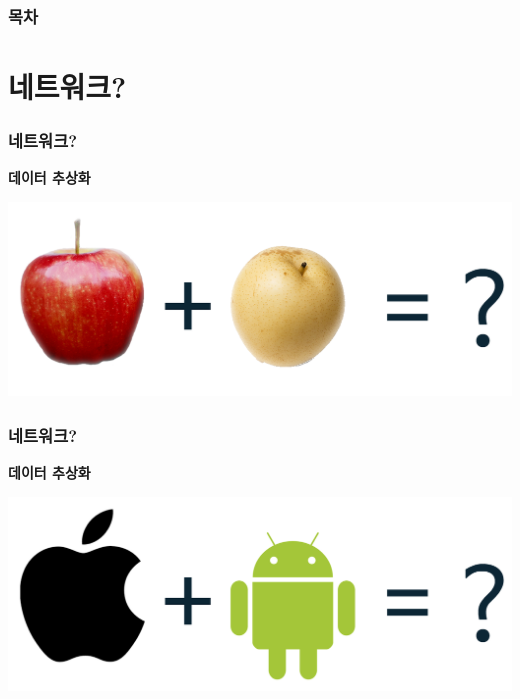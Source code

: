 \documentclass{beamer}
\begin{document}
\begin{frame}
\frametitle{목차} %
\tableofcontents %
\end{frame}


\section{네트워크?}
\begin{frame}
\frametitle{네트워크?}
\textbf{데이터 추상화}\\
\begin{center}
\includegraphics[scale=0.3]{applepear.png}
\end{center}
\end{frame}

\begin{frame}
\frametitle{네트워크?}
\textbf{데이터 추상화}\\
\begin{center}
\includegraphics[scale=0.3]{android.png}
\end{center}
\end{frame}
\end{document}
